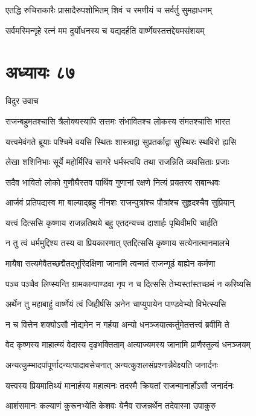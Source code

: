 \twolineshloka
{एतद्धि रुचिराकारैः प्रासादैरुपशोभितम्}
{शिवं च रमणीयं च सर्वर्तु सुमहाधनम्}


\twolineshloka
{सर्वमस्मिन्गृहे रत्नं मम दुर्योधनस्य च}
{यद्यदर्हति वार्ष्णेयस्तत्तद्देयमसंशयम्}


\chapter{अध्यायः ८७}
\twolineshloka
{विदुर उवाच}
{}


\twolineshloka
{राजन्बहुमतश्चासि त्रैलोक्यस्यापि सत्तमः}
{संभावितश्च लोकस्य संमतश्चासि भारत}


\twolineshloka
{यत्त्वमेवंगते ब्रूयाः पश्चिमे वयसि स्थितः}
{शास्त्राद्वा सुप्रतर्काद्वा सुस्थिरः स्थविरो ह्यसि}


\twolineshloka
{लेखा शशिनिभाः सूर्ये महोर्मिरिव सागरे}
{धर्मस्त्वयि तथा राजन्निति व्यवसिताः प्रजाः}


\twolineshloka
{सदैव भावितो लोको गुणौघैस्तव पार्थिव}
{गुणानां रक्षणे नित्यं प्रयतस्व सबान्धवः}


\twolineshloka
{आर्जवं प्रतिपद्यस्व मा बाल्याद्ब्रहु नीनशः}
{राजन्पुत्रांश्च पौत्रांश्च सुहृदश्चैव सुप्रियान्}


\twolineshloka
{यत्त्वं दित्ससि कृष्णाय राजन्नतिथये बहु}
{एतदन्यच्च दाशार्हः पृथिवीमपि चार्हति}


\twolineshloka
{न तु त्वं धर्ममुद्दिश्य तस्य वा प्रियकारणात्}
{एतद्दित्ससि कृष्णाय सत्येनात्मानमालभे}


\twolineshloka
{मायैषा सत्यमेवैतच्छद्मैतद्भूरिदक्षिणा}
{जानामि त्वन्मतं राजन्गूढं बाह्येन कर्मणा}


\twolineshloka
{पञ्च पञ्चैव लिप्स्यन्ति ग्रामकान्पाण्डवा नृप}
{न च दित्ससि तेभ्यस्तांस्तच्छमं न करिष्यसि}


\twolineshloka
{अर्थेन तु महाबाहुं वार्ष्णेयं त्वं जिहीर्षसि}
{अनेन चाप्युपायेन पाण्डवेभ्यो विभेत्स्यसि}


\twolineshloka
{न च वित्तेन शक्योऽसौ नोद्यमेन न गर्हया}
{अन्यो धनञ्जयात्कर्तुमेतत्तत्त्वं ब्रवीमि ते}


\twolineshloka
{वेद कृष्णस्य माहात्म्यं वेदास्य दृढभक्तिताम्}
{अत्याज्यमस्य जानामि प्राणैस्तुल्यं धनञ्जयम्}


\twolineshloka
{अन्यत्कुम्भादपांपूर्णादन्यत्पादावसेचनात्}
{अन्यत्कुशलसंप्रश्नान्नैवेक्ष्यति जनार्दनः}


\twolineshloka
{यत्त्वस्य प्रियमातिथ्यं मानार्हस्य महात्मनः}
{तदस्मै क्रियतां राजन्मानार्होऽसौ जनार्दनः}


\twolineshloka
{आशंसमानः कल्याणं कुरूनभ्येति केशवः}
{येनैव राजन्नर्थेन तदेवास्मा उपाकुरु}


